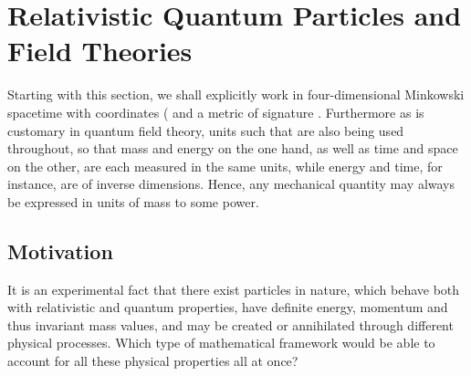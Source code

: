 \documentclass[a4paper,11pt]{article}
\begin{document}
\section{Relativistic Quantum Particles and Field Theories}
\label{Sect3}

Starting with this section, we shall explicitly work in four-dimensional
Minkowski spacetime with coordinates \coordHE{} (\coordHE{} and
a metric \myHighlight{$\eta_{\mu\nu}$}\coordHE{} of signature \myHighlight{$(+---)$}\coordHE{}. Furthermore as is
customary in quantum field theory, units such that \coordHE{} are also 
being used throughout, so that mass and energy on the one hand, as well
as time and space on the other, are each measured in the same units,
while energy and time, for instance, are of inverse dimensions. Hence,
any mechanical quantity may always be expressed in units of mass
to some power.

\subsection{Motivation}
\label{Subsect3.1}

It is an experimental fact that there exist particles in nature, which
behave both with relativistic and quantum properties, have definite
energy, momentum and thus invariant mass values, and may be created
or annihilated through different physical processes. Which type of
mathematical framework would be able to account for all these physical
properties all at once? 
\end{document}
